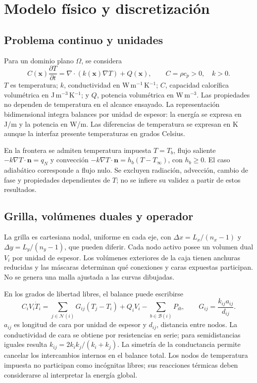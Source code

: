 \documentclass[11pt,a4paper]{article}
\begin{document}
\section{Modelo físico y discretización}
\subsection{Problema continuo y unidades}
Para un dominio plano $\Omega$, se considera
\begin{equation}
 C(\mathbf{x})\frac{\partial T}{\partial t}=\nabla\!\cdot(k(\mathbf{x})\nabla T)+Q(\mathbf{x}),\qquad C=\rho c_p>0,\quad k>0.
 \label{eq:pde}
\end{equation}
$T$ es temperatura; $k$, conductividad en W\,m$^{-1}$\,K$^{-1}$; $C$, capacidad calorífica volumétrica en J\,m$^{-3}$\,K$^{-1}$; y $Q$, potencia volumétrica en W\,m$^{-3}$. Las propiedades no dependen de temperatura en el alcance ensayado. La representación bidimensional integra balances por unidad de espesor: la energía se expresa en J/m y la potencia en W/m. Las diferencias de temperatura se expresan en K aunque la interfaz presente temperaturas en grados Celsius.

En la frontera se admiten temperatura impuesta $T=T_b$, flujo saliente $-k\nabla T\cdot\mathbf n=q_N$ y convección $-k\nabla T\cdot\mathbf n=h_b(T-T_\infty)$, con $h_b\geq0$. El caso adiabático corresponde a flujo nulo. Se excluyen radiación, advección, cambio de fase y propiedades dependientes de $T$; no se infiere su validez a partir de estos resultados.

\subsection{Grilla, volúmenes duales y operador}
La grilla es cartesiana nodal, uniforme en cada eje, con $\Delta x=L_x/(n_x-1)$ y $\Delta y=L_y/(n_y-1)$, que pueden diferir. Cada nodo activo posee un volumen dual $V_i$ por unidad de espesor. Los volúmenes exteriores de la caja tienen anchuras reducidas y las máscaras determinan qué conexiones y caras expuestas participan. No se genera una malla ajustada a las curvas dibujadas.

En los grados de libertad libres, el balance puede escribirse
\begin{equation}
 C_iV_i\dot T_i=\sum_{j\in\mathcal N(i)}G_{ij}(T_j-T_i)+Q_iV_i-\sum_{b\in\mathcal B(i)}P_{ib},\qquad G_{ij}=\frac{k_{ij}a_{ij}}{d_{ij}}.
 \label{eq:balance}
\end{equation}
$a_{ij}$ es longitud de cara por unidad de espesor y $d_{ij}$, distancia entre nodos. La conductividad de cara se obtiene por resistencias en serie; para semidistancias iguales resulta $k_{ij}=2k_ik_j/(k_i+k_j)$. La simetría de la conductancia permite cancelar los intercambios internos en el balance total. Los nodos de temperatura impuesta no participan como incógnitas libres; sus reacciones térmicas deben considerarse al interpretar la energía global.
\end{document}
